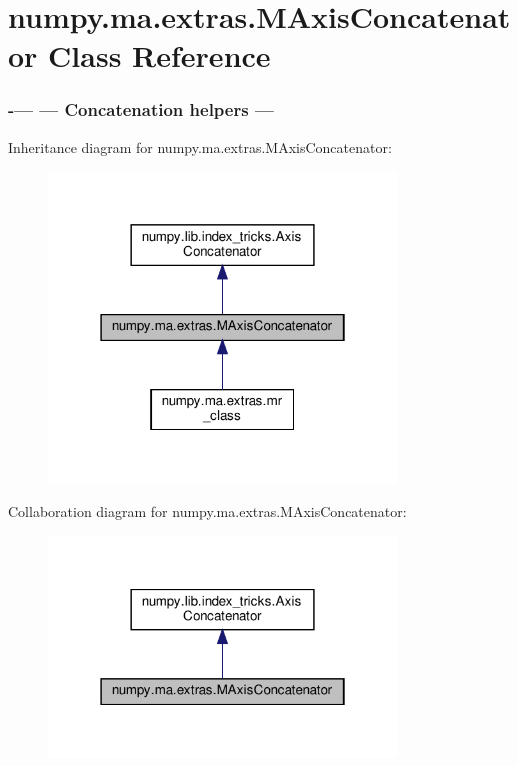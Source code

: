 \hypertarget{classnumpy_1_1ma_1_1extras_1_1MAxisConcatenator}{}\section{numpy.\+ma.\+extras.\+M\+Axis\+Concatenator Class Reference}
\label{classnumpy_1_1ma_1_1extras_1_1MAxisConcatenator}




 \subsubsection*{-\/--- --- Concatenation helpers --- } 




Inheritance diagram for numpy.\+ma.\+extras.\+M\+Axis\+Concatenator\+:
\nopagebreak
\begin{figure}[H]
\begin{center}
\leavevmode
\includegraphics[width=262pt]{classnumpy_1_1ma_1_1extras_1_1MAxisConcatenator__inherit__graph}
\end{center}
\end{figure}


Collaboration diagram for numpy.\+ma.\+extras.\+M\+Axis\+Concatenator\+:
\nopagebreak
\begin{figure}[H]
\begin{center}
\leavevmode
\includegraphics[width=262pt]{classnumpy_1_1ma_1_1extras_1_1MAxisConcatenator__coll__graph}
\end{center}
\end{figure}
